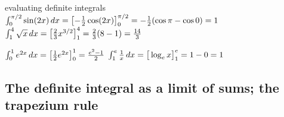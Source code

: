 \begin{example}{evaluating definite integrals \byhand}
$\int_0^{\pi/2}\sin(2x)\,dx=\left[-\tfrac12\cos(2x)\right]_0^{\pi/2}=-\tfrac12(\cos\pi-\cos0)=1$ \qquad
$\int_1^4\sqrt x\,dx=\left[\tfrac23x^{3/2}\right]_1^4=\tfrac23(8-1)=\tfrac{14}{3}$\par
$\int_0^1e^{2x}\,dx=\left[\tfrac12e^{2x}\right]_0^1=\tfrac{e^2-1}{2}$ \qquad
$\int_1^e\tfrac1x\,dx=\big[\log_e x\big]_1^e=1-0=1$
\end{example}

\subsection{The definite integral as a limit of sums; the trapezium rule}
\label{sec:trap}

